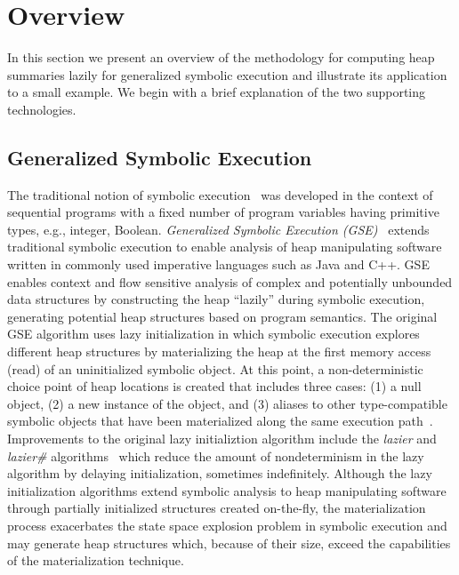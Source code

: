 \section{Overview}
\label{sec:overview}

In this section we present an overview of the methodology for
computing heap summaries lazily for generalized symbolic execution
and illustrate its application to a small example. We begin with
a brief explanation of the two supporting technologies.

\subsection{Generalized Symbolic Execution}

The traditional notion of symbolic 
execution~\cite{clarke76TSE,King:76} was developed in the
context of sequential programs with a fixed number of program
variables having primitive types, e.g., integer, Boolean.
\emph{Generalized Symbolic Execution (GSE)}~\cite{GSE03} extends
traditional symbolic execution to enable analysis of heap
manipulating software written in commonly used imperative
languages such as Java and C++. 
GSE enables context and flow sensitive analysis of complex
and potentially unbounded data structures by
constructing the heap ``lazily'' during symbolic execution,
generating potential heap structures based on program semantics.
The original GSE algorithm uses lazy initialization in which
symbolic execution explores different heap structures
by materializing the heap at the first memory access (read) of
an uninitialized symbolic object. At this point, a non-deterministic
choice point of heap locations is created that includes three cases:
(1) a null
object, (2) a new instance of the object, and (3) aliases
to other type-compatible symbolic objects that have been materialized
along the same execution path~\cite{GSE03}.  
Improvements to the original lazy initializtion algorithm include the 
\emph{lazier} and \emph{lazier\#} algorithms~\cite{Kiasan06,Kiasan07}
which
reduce the amount of nondeterminism in the lazy algorithm by
delaying initialization, sometimes indefinitely. 
Although the lazy initialization algorithms extend symbolic
analysis to heap manipulating software through partially initialized
structures created on-the-fly, the materialization process
exacerbates the state space explosion problem in symbolic
execution and may generate
heap structures which, because of their size, exceed the capabilities
of the materialization technique.

